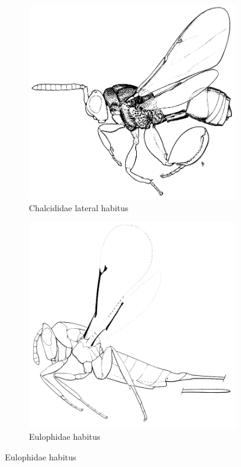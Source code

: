 \documentclass[letterpaper, 11pt]{article}
\begin{document}
\begin{figure}[ht!]
  \centering
\begin{subfigure}[ht!]{0.45\textwidth}
    \includegraphics[width=\textwidth]{ChalcididHabitus}
  \caption{Chalcididae lateral habitus \citep[][Fig. 212]{goulet1993hymenoptera}}
  \label{fig:chalcidid}
\end{subfigure}
    \hfill
\begin{subfigure}[ht!]{0.45\textwidth}
    \includegraphics[width=\textwidth]{EulophidHabitus}
  \caption{Eulophidae habitus \citep[][Fig. 228]{goulet1993hymenoptera}}
  \label{fig:eulophid}
\end{subfigure}
\label{fig:xxxxxx}
\end{figure}
\end{document}
